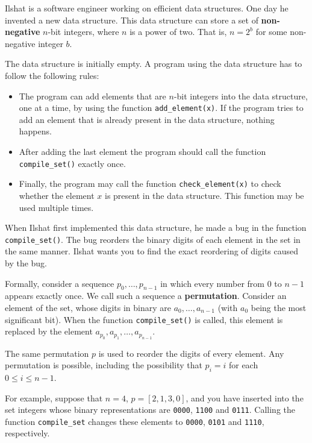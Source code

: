 Ilshat is a software engineer working on efficient data structures. One day he invented a new data structure. 
This data structure can store a set of \textbf{non-negative} $n$-bit integers, where $n$ is a power of two. 
That is, $n = 2^b$ for some non-negative integer $b$.

The data structure is initially empty. A program using the data structure has to follow the following rules:

\begin{itemize}
\item The program can add elements that are $n$-bit integers into the data structure, one at a time, by using the 
function \texttt{add\_element(x)}. If the program tries to add an element that is already present in the data structure,
nothing happens.
\item After adding the last element the program should call the function \texttt{compile\_set()} exactly once.
\item Finally, the program may call the function \texttt{check\_element(x)} to check whether the element $x$ is present
in the data structure. This function may be used multiple times.
\end{itemize}

When Ilshat first implemented this data structure, he made a bug in the function \texttt{compile\_set()}. The bug
reorders the binary digits of each element in the set in the same manner. Ilshat wants you to find the exact reordering
of digits caused by the bug.

Formally, consider a sequence $p_0, \ldots, p_{n - 1}$ in which every number from $0$ to $n - 1$ appears exactly once. 
We call such a sequence a \textbf{permutation}. Consider an element of the set, whose digits in binary are $a_0, \ldots, a_{n - 1}$ 
(with $a_0$ being the most significant bit). When the function \texttt{compile\_set()} is called, this element is replaced
by the element $a_{p_0}, a_{p_1}, \ldots, a_{p_{n - 1}}$. 

The same permutation $p$ is used to reorder the digits of every element. Any permutation is possible, including the possibility
that $p_i = i$ for each $0 \le i \le n - 1$.

For example, suppose that $n = 4$, $p = [2, 1, 3, 0]$, and you have inserted into the set integers whose binary representations
are \texttt{0000}, \texttt{1100} and \texttt{0111}. Calling the function \texttt{compile\_set} changes these elements to
\texttt{0000}, \texttt{0101} and \texttt{1110}, respectively.

